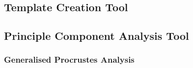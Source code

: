 \documentclass[a4paper, 12pt]{article}
\begin{document}
	\subsection{Template Creation Tool}
	\subsection{Principle Component Analysis Tool}
		\subsubsection{Generalised Procrustes Analysis}
		
\end{document}
